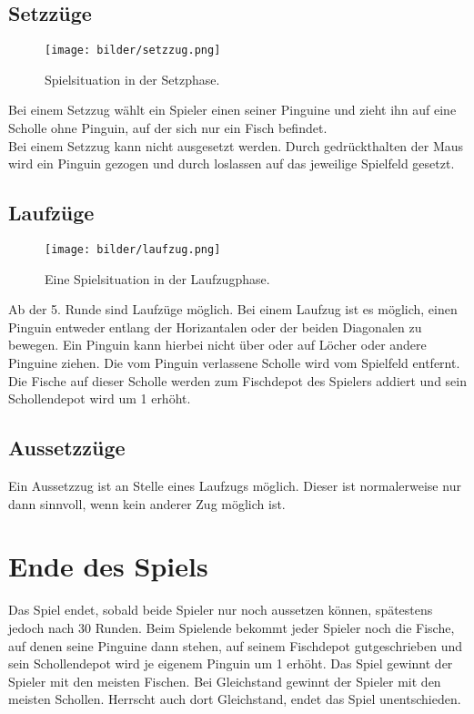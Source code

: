 \documentclass[a4paper, ngerman]{scrartcl}
\begin{document}
	
	
	\subsection{Setzzüge}
	
	\begin{figure}[h!]
		\centering
		\texttt{[image: bilder/setzzug.png]}
		\caption{Spielsituation in der Setzphase.}
		\label{fig:Setzzug}
	\end{figure}
	Bei einem Setzzug wählt ein Spieler einen seiner
	Pinguine und zieht ihn auf eine Scholle ohne Pinguin, auf der sich nur ein
	Fisch befindet.\\
	Bei einem Setzzug kann nicht ausgesetzt werden. Durch gedrückthalten der Maus
	wird ein Pinguin gezogen und durch loslassen auf das jeweilige Spielfeld
	gesetzt.
	
	
	 
\subsection{Laufzüge}
	 
	\begin{figure}[h!]
		\centering
		\texttt{[image: bilder/laufzug.png]}
		\caption{Eine Spielsituation in der Laufzugphase.}
		\label{fig:Laufzug}
	\end{figure}
	
Ab der 5. Runde sind Laufzüge möglich. Bei einem Laufzug
ist es möglich, einen Pinguin entweder entlang der Horizantalen oder der beiden
Diagonalen zu bewegen. Ein Pinguin kann hierbei nicht über oder auf Löcher oder
andere Pinguine ziehen. Die vom Pinguin verlassene Scholle wird vom Spielfeld entfernt.
Die Fische auf dieser Scholle werden zum Fischdepot des Spielers addiert und sein 
Schollendepot wird um 1 erhöht.



\subsection{Aussetzzüge}
Ein Aussetzzug ist an Stelle eines Laufzugs möglich. Dieser ist normalerweise
nur dann sinnvoll, wenn kein anderer Zug möglich ist.

	
\section{Ende des Spiels} 
	Das Spiel endet, sobald beide Spieler nur noch aussetzen können, 
	spätestens jedoch nach 30 Runden.  Beim Spielende bekommt jeder 
	Spieler noch die Fische, auf denen seine Pinguine dann stehen, 
	auf seinem Fischdepot gutgeschrieben und sein Schollendepot wird 
	je eigenem Pinguin um 1 erhöht.
	Das Spiel gewinnt der Spieler mit den meisten Fischen. Bei Gleichstand gewinnt
	der Spieler mit den meisten Schollen. Herrscht auch dort Gleichstand, endet das
	Spiel unentschieden.
	
\end{document}
